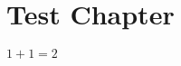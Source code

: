 \chapter{Test Chapter}

\begin{theorem}\label{def:one_add_one_eq_two}\leanok
  $1 + 1 = 2$
\end{theorem}

